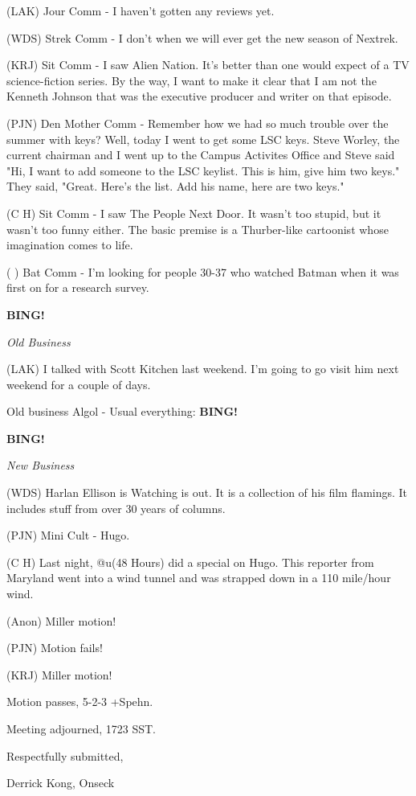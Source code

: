 \documentclass[12pt]{article}
\newcommand{\bing}{{\bf BING!} }
\newcommand{\goto}[1]{\bing \vskip 12pt \centerline{{\em{#1}}}}
\begin{document}
(LAK) Jour Comm - I haven't gotten any reviews yet.

(WDS) Strek Comm - I don't when we will ever get the new season of Nextrek.

(KRJ) Sit Comm - I saw Alien Nation. It's better than one would expect of a TV science-fiction series. By the way, I want to make it clear that I am not the Kenneth Johnson that was the executive producer and writer on that episode.

(PJN) Den Mother Comm - Remember how we had so much trouble over the summer with keys? Well, today I went to get some LSC keys.  Steve Worley, the current chairman and I went up to the Campus Activites Office and Steve said  "Hi, I want to add someone to the LSC keylist. This is him, give him two keys."  They said, "Great.  Here's the list. Add his name, here are two keys."

(C H) Sit Comm - I saw The People Next Door. It wasn't too stupid, but it wasn't too funny either. The basic premise is a Thurber-like cartoonist whose imagination comes to life.

(   ) Bat Comm - I'm looking for people 30-37 who watched Batman when it was first on for a research survey.

\goto{Old Business}

(LAK) I talked with Scott Kitchen last weekend.  I'm going to go visit him next weekend for a couple of days.

Old business Algol - Usual everything: \bing

\goto{New Business}

(WDS) Harlan Ellison is Watching is out. It is a collection of his film flamings. It includes stuff from over 30 years of columns.

(PJN) Mini Cult - Hugo.

(C H) Last night, @u(48 Hours) did a special on Hugo. This reporter from Maryland went into a wind tunnel and was strapped down in a 110 mile/hour wind.

(Anon) Miller motion!

(PJN) Motion fails!

(KRJ) Miller motion!

Motion passes, 5-2-3 +Spehn.

\vspace{12pt}

\noindent
Meeting adjourned, 1723 SST.

\vspace{18pt}

\centerline{Respectfully submitted,}
\centerline{Derrick Kong, Onseck}
\end{document}
